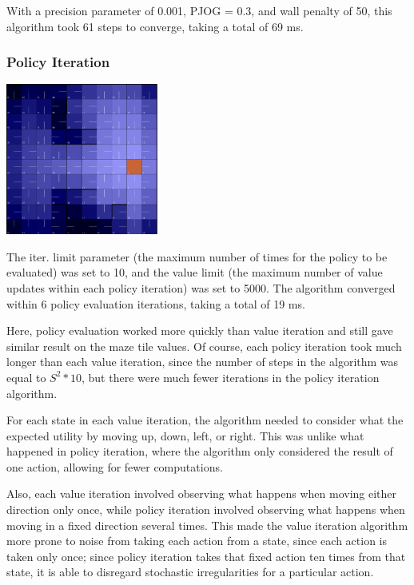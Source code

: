 \documentclass[11pt]{article}
\begin{document}
            With a precision parameter of 0.001, PJOG = 0.3,
            and wall penalty of 50, this algorithm took 61 steps
            to converge, taking a total of 69 ms.

            \subsubsection{Policy Iteration}

            \includegraphics[width=5cm]{../images/small/pi.PNG}

            The iter. limit parameter (the maximum number
            of times for the policy to be evaluated) was set
            to 10, and the value limit (the maximum number of
            value updates within each policy iteration) was
            set to 5000. The algorithm converged within 6 policy
            evaluation iterations, taking a total of 19 ms.


            Here, policy evaluation worked more quickly than value iteration and
            still gave similar result on the maze tile values. Of course, each
            policy iteration took much longer than each value iteration,
            since the number of steps in the algorithm was equal to $S^2 * 10$,
            but there were much fewer iterations in the policy iteration algorithm.

            For each state in each value iteration, the algorithm needed to consider
            what the expected utility by moving up, down, left, or right. This was
            unlike what happened in policy iteration, where the algorithm only considered
            the result of one action, allowing for fewer computations.
            
            Also, each value iteration involved observing what happens when moving either direction only once,
            while policy iteration involved observing what happens when moving in a fixed direction several times.
            This made the value iteration algorithm more prone to noise from taking each action
            from a state, since each action is taken only once; since policy iteration takes that fixed action
            ten times from that state, it is able to disregard stochastic irregularities for a particular
            action.
\end{document}
